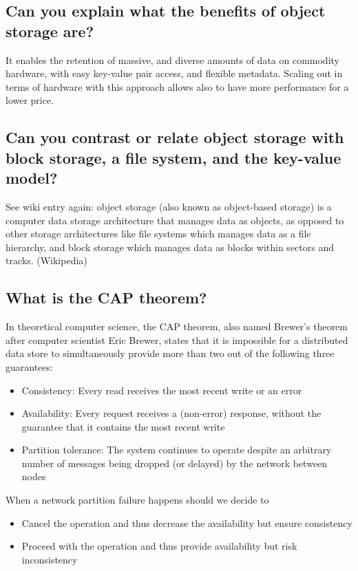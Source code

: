 \documentclass{article}
\begin{document}
\subsection{Can you explain what the benefits of object storage are?}

It enables the retention of massive, and diverse amounts of data on commodity hardware, with easy key-value pair access, and flexible metadata. Scaling out in terms of hardware with this approach allows also to have more performance for a lower price.

\subsection{Can you contrast or relate object storage with block storage, a file system, and the key-value model?}

See wiki entry again: object storage (also known as object-based storage) is a computer data storage architecture that manages data as objects, as opposed to other storage architectures like file systems which manages data as a file hierarchy, and block storage which manages data as blocks within sectors and tracks. (Wikipedia)

\subsection{What is the CAP theorem?}

In theoretical computer science, the CAP theorem, also named Brewer's theorem after computer scientist Eric Brewer, states that it is impossible for a distributed data store to simultaneously provide more than two out of the following three guarantees:

\begin{itemize}
\item Consistency: Every read receives the most recent write or an error
\item Availability: Every request receives a (non-error) response, without the guarantee that it contains the most recent write
\item Partition tolerance: The system continues to operate despite an arbitrary number of messages being dropped (or delayed) by the network between nodes
\end{itemize}

When a network partition failure happens should we decide to

\begin{itemize}
\item Cancel the operation and thus decrease the availability but ensure consistency
\item Proceed with the operation and thus provide availability but risk inconsistency
\end{itemize}
\end{document}
